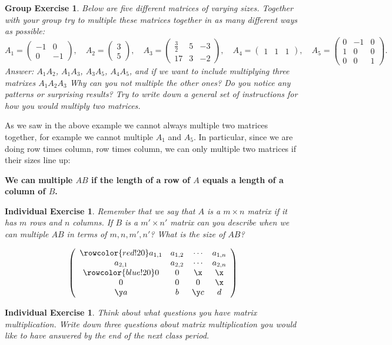 \documentclass[10pt,reqno]{amsart}
\newtheorem{groupExercise}[lemma]{Group Exercise}
\newtheorem{individualExercise}[lemma]{Individual Exercise}
\theoremstyle{remark}
\begin{document}
\begin{groupExercise}
Below are five different matrices of varying sizes. Together with your group try to multiple these matrices together in as many different ways as possible:
\[
A_{1}=\begin{pmatrix}
-1 & 0 \\
0 & -1 
\end{pmatrix}, \quad 
A_{2}=\begin{pmatrix} 3 \\
5
\end{pmatrix}, \quad 
A_{3}=\begin{pmatrix} \frac{3}{2} & 5 & -3 \\
17 & 3 & -2
\end{pmatrix}, \quad 
A_{4} = \begin{pmatrix} 
1 & 1 & 1
\end{pmatrix}, \quad
A_{5} = \begin{pmatrix} 0 & -1 & 0 \\
1 & 0 & 0 \\
0 & 0 & 1
\end{pmatrix}.
\]
{\color{red}Answer:  $A_{1}A_{2}$, $A_{1}A_{3}$, $A_{3}A_{5}$, $A_{4}A_{5}$, and if we want to include multiplying three matrixes $A_{1}A_{2}A_{3}$} Why can you not multiple the other ones? Do you notice any patterns or surprising results? Try to write down a general set of instructions for how you would multiply two matrices. 
\end{groupExercise}

As we saw in the above example we cannot always multiple two matrices together, for example we cannot multiple  $A_{1}$ and $A_{5}$. In particular, since we are doing row times column, row times column, we can only multiple two matrices if their sizes line up:
\begin{center}
\textbf{We can multiple $AB$ if the length of a row of $A$ equals a length of a column of $B$.}
\end{center}

\begin{individualExercise}
Remember that we say that $A$ is a $m\times n$ matrix if it has $m$ rows and $n$ columns. If $B$ is a $m'\times n'$ matrix can you describe when we can multiple $AB$ in terms of $m,n,m',n'$? What is the size of $AB$?
\end{individualExercise}

\[
  \left(\begin{array}{cccc}
    \rowcolor{red!20}
    a_{1,1} & a_{1,2} & \cdots & a_{1,n} \\
    a_{2,1} & a_{2,2} & \cdots & a_{2,n} \\
   \rowcolor{blue!20}
    0   & 0   & \x & \x \\
    0   & 0   & 0  & \x \\
    \y a  &  b  & \y c &  d\\
  \end{array}\right)
  \]

\begin{individualExercise}
Think about what questions you have matrix multiplication. Write down three questions about matrix multiplication you would like to have answered by the end of the next class period. 
\end{individualExercise}
\end{document}
